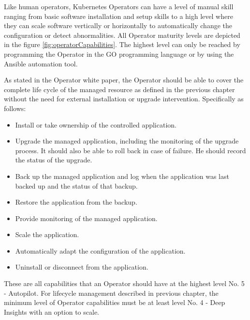 
Like human operators, Kubernetes Operators can have a level of manual skill ranging from basic software installation and setup skills to a high level where they can scale software vertically or horizontally to automatically change the configuration or detect abnormalities. All Operator maturity levels are depicted in the figure \ref{fig:operatorCapabilities}. The highest level can only be reached by programming the Operator in the GO programming language or by using the Ansible automation tool. \cite{OperatorsOframework}


As stated in the Operator white paper, \cite{OperatorWhitepaper} the Operator should be able to cover the complete life cycle of the managed resource as defined in the previous chapter without the need for external installation or upgrade intervention. Specifically as follows:
\begin{itemize}
  \item Install or take ownership of the controlled application.
  \item Upgrade the managed application, including the monitoring of the upgrade process. It should also be able to roll back in case of failure. He should record the status of the upgrade.
  \item Back up the managed application and log when the application was last backed up and the status of that backup.
  \item Restore the application from the backup.
  \item Provide monitoring of the managed application.
  \item Scale the application.
  \item Automatically adapt the configuration of the application.
  \item Uninstall or disconnect from the application.
\end{itemize}

These are all capabilities that an Operator should have at the highest level No. 5 - Autopilot. For lifecycle management described in previous chapter, the minimum level of Operator capabilities must be at least level No. 4 - Deep Insights with an option to scale.

